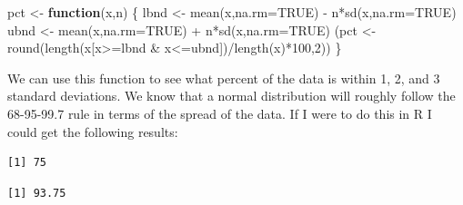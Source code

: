\documentclass[
  letterpaper,
  DIV=11,
  numbers=noendperiod]{scrreprt}
\newenvironment{Shaded}{\begin{snugshade}}{\end{snugshade}}
\newcommand{\AttributeTok}[1]{\textcolor[rgb]{0.40,0.45,0.13}{#1}}
\newcommand{\CommentTok}[1]{\textcolor[rgb]{0.37,0.37,0.37}{#1}}
\newcommand{\ConstantTok}[1]{\textcolor[rgb]{0.56,0.35,0.01}{#1}}
\newcommand{\ControlFlowTok}[1]{\textcolor[rgb]{0.00,0.23,0.31}{\textbf{#1}}}
\newcommand{\DecValTok}[1]{\textcolor[rgb]{0.68,0.00,0.00}{#1}}
\newcommand{\FunctionTok}[1]{\textcolor[rgb]{0.28,0.35,0.67}{#1}}
\newcommand{\NormalTok}[1]{\textcolor[rgb]{0.00,0.23,0.31}{#1}}
\newcommand{\OtherTok}[1]{\textcolor[rgb]{0.00,0.23,0.31}{#1}}
\newcommand{\SpecialCharTok}[1]{\textcolor[rgb]{0.37,0.37,0.37}{#1}}
\begin{document}
\begin{Shaded}
\begin{Highlighting}[]
\NormalTok{pct }\OtherTok{\textless{}{-}} \ControlFlowTok{function}\NormalTok{(x,n) \{}
\NormalTok{     lbnd }\OtherTok{\textless{}{-}} \FunctionTok{mean}\NormalTok{(x,}\AttributeTok{na.rm=}\ConstantTok{TRUE}\NormalTok{) }\SpecialCharTok{{-}}\NormalTok{ n}\SpecialCharTok{*}\FunctionTok{sd}\NormalTok{(x,}\AttributeTok{na.rm=}\ConstantTok{TRUE}\NormalTok{)}
\NormalTok{     ubnd }\OtherTok{\textless{}{-}} \FunctionTok{mean}\NormalTok{(x,}\AttributeTok{na.rm=}\ConstantTok{TRUE}\NormalTok{) }\SpecialCharTok{+}\NormalTok{ n}\SpecialCharTok{*}\FunctionTok{sd}\NormalTok{(x,}\AttributeTok{na.rm=}\ConstantTok{TRUE}\NormalTok{)}
\NormalTok{     (pct }\OtherTok{\textless{}{-}} \FunctionTok{round}\NormalTok{(}\FunctionTok{length}\NormalTok{(x[x}\SpecialCharTok{\textgreater{}=}\NormalTok{lbnd }\SpecialCharTok{\&}\NormalTok{ x}\SpecialCharTok{\textless{}=}\NormalTok{ubnd])}\SpecialCharTok{/}\FunctionTok{length}\NormalTok{(x)}\SpecialCharTok{*}\DecValTok{100}\NormalTok{,}\DecValTok{2}\NormalTok{))}
\NormalTok{\}}
\end{Highlighting}
\end{Shaded}

We can use this function to see what percent of the data is within 1, 2,
and 3 standard deviations. We know that a normal distribution will
roughly follow the 68-95-99.7 rule in terms of the spread of the data.
If I were to do this in R I could get the following results:

\begin{Shaded}
\end{Shaded}

\begin{verbatim}
[1] 75
\end{verbatim}

\begin{Shaded}
\end{Shaded}

\begin{verbatim}
[1] 93.75
\end{verbatim}
\end{document}
